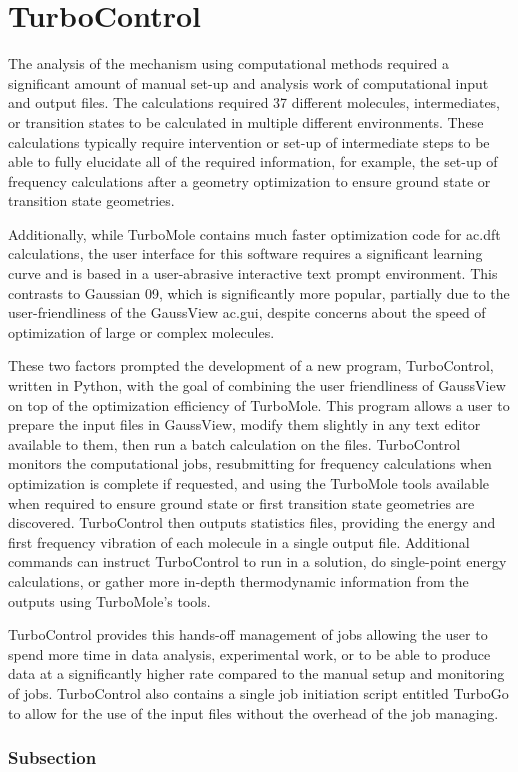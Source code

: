 \chapter{TurboControl}\label{chap.turbocontrol}

The analysis of the mechanism using computational methods required a significant amount of manual set-up and analysis work of computational input and output files. The calculations required 37 different molecules, intermediates, or transition states to be calculated in multiple different environments. These calculations typically require intervention or set-up of intermediate steps to be able to fully elucidate all of the required information, for example, the set-up of frequency calculations after a geometry optimization to ensure ground state or transition state geometries. 

Additionally, while TurboMole contains much faster optimization code for \gls{ac.dft} calculations, the user interface for this software requires a significant learning curve and is based in a user-abrasive interactive text prompt environment. This contrasts to Gaussian 09, which is significantly more popular, partially due to the user-friendliness of the GaussView \gls{ac.gui}, despite concerns about the speed of optimization of large or complex molecules.

These two factors prompted the development of a new program, TurboControl, written in Python, with the goal of combining the user friendliness of GaussView on top of the optimization efficiency of TurboMole. This program allows a user to prepare the input files in GaussView, modify them slightly in any text editor available to them, then run a batch calculation on the files. TurboControl monitors the computational jobs, resubmitting for frequency calculations when optimization is complete if requested, and using the TurboMole tools available when required to ensure ground state or first transition state geometries are discovered. TurboControl then outputs statistics files, providing the energy and first frequency vibration of each molecule in a single output file. Additional commands can instruct TurboControl to run in a solution, do single-point energy calculations, or gather more in-depth thermodynamic information from the outputs using TurboMole's tools. 

TurboControl provides this hands-off management of jobs allowing the user to spend more time in data analysis, experimental work, or to be able to produce data at a significantly higher rate compared to the manual setup and monitoring of jobs. TurboControl also contains a single job initiation script entitled TurboGo to allow for the use of the input files without the overhead of the job managing.

\subsection{Subsection}



